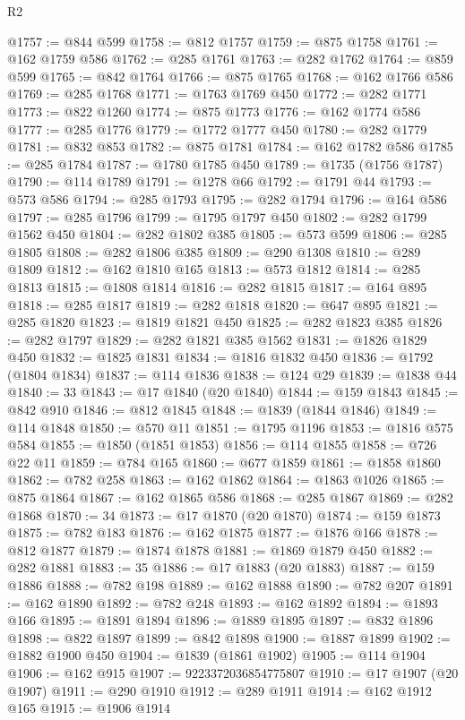 \begin{lexlean}{R2}
\begin{coremodule}
@1757 := @844 @599
@1758 := @812 @1757
@1759 := @875 @1758
@1761 := @162 @1759 @586
@1762 := @285 @1761
@1763 := @282 @1762
@1764 := @859 @599
@1765 := @842 @1764
@1766 := @875 @1765
@1768 := @162 @1766 @586
@1769 := @285 @1768
@1771 := @1763 @1769 @450
@1772 := @282 @1771
@1773 := @822 @1260
@1774 := @875 @1773
@1776 := @162 @1774 @586
@1777 := @285 @1776
@1779 := @1772 @1777 @450
@1780 := @282 @1779
@1781 := @832 @853
@1782 := @875 @1781
@1784 := @162 @1782 @586
@1785 := @285 @1784
@1787 := @1780 @1785 @450
@1789 := @1735 (@1756 @1787)
@1790 := @114 @1789
@1791 := @1278 @66
@1792 := @1791 @44
@1793 := @573 @586
@1794 := @285 @1793
@1795 := @282 @1794
@1796 := @164 @586
@1797 := @285 @1796
@1799 := @1795 @1797 @450
@1802 := @282 @1799 @1562 @450
@1804 := @282 @1802 @385
@1805 := @573 @599
@1806 := @285 @1805
@1808 := @282 @1806 @385
@1809 := @290 @1308
@1810 := @289 @1809
@1812 := @162 @1810 @165
@1813 := @573 @1812
@1814 := @285 @1813
@1815 := @1808 @1814
@1816 := @282 @1815
@1817 := @164 @895
@1818 := @285 @1817
@1819 := @282 @1818
@1820 := @647 @895
@1821 := @285 @1820
@1823 := @1819 @1821 @450
@1825 := @282 @1823 @385
@1826 := @282 @1797
@1829 := @282 @1821 @385 @1562
@1831 := @1826 @1829 @450
@1832 := @1825 @1831
@1834 := @1816 @1832 @450
@1836 := @1792 (@1804 @1834)
@1837 := @114 @1836
@1838 := @124 @29
@1839 := @1838 @44
@1840 := 33
@1843 := @17 @1840 (@20 @1840)
@1844 := @159 @1843
@1845 := @842 @910
@1846 := @812 @1845
@1848 := @1839 (@1844 @1846)
@1849 := @114 @1848
@1850 := @570 @11
@1851 := @1795 @1196
@1853 := @1816 @575 @584
@1855 := @1850 (@1851 @1853)
@1856 := @114 @1855
@1858 := @726 @22 @11
@1859 := @784 @165
@1860 := @677 @1859
@1861 := @1858 @1860
@1862 := @782 @258
@1863 := @162 @1862
@1864 := @1863 @1026
@1865 := @875 @1864
@1867 := @162 @1865 @586
@1868 := @285 @1867
@1869 := @282 @1868
@1870 := 34
@1873 := @17 @1870 (@20 @1870)
@1874 := @159 @1873
@1875 := @782 @183
@1876 := @162 @1875
@1877 := @1876 @166
@1878 := @812 @1877
@1879 := @1874 @1878
@1881 := @1869 @1879 @450
@1882 := @282 @1881
@1883 := 35
@1886 := @17 @1883 (@20 @1883)
@1887 := @159 @1886
@1888 := @782 @198
@1889 := @162 @1888
@1890 := @782 @207
@1891 := @162 @1890
@1892 := @782 @248
@1893 := @162 @1892
@1894 := @1893 @166
@1895 := @1891 @1894
@1896 := @1889 @1895
@1897 := @832 @1896
@1898 := @822 @1897
@1899 := @842 @1898
@1900 := @1887 @1899
@1902 := @1882 @1900 @450
@1904 := @1839 (@1861 @1902)
@1905 := @114 @1904
@1906 := @162 @915
@1907 := 9223372036854775807
@1910 := @17 @1907 (@20 @1907)
@1911 := @290 @1910
@1912 := @289 @1911
@1914 := @162 @1912 @165
@1915 := @1906 @1914

\end{coremodule}
\end{lexlean}
